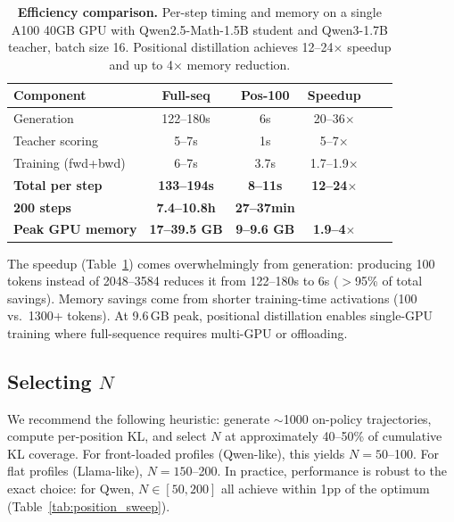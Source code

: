 \documentclass[10pt]{article}
\begin{document}
\begin{table}[t]
\centering
\caption{\textbf{Efficiency comparison.} Per-step timing and memory on a single A100 40GB GPU with Qwen2.5-Math-1.5B student and Qwen3-1.7B teacher, batch size 16. Positional distillation achieves 12--24$\times$ speedup and up to 4$\times$ memory reduction.}
\label{tab:efficiency}
\small
\begin{tabular}{@{}lccccc@{}}
\toprule
\textbf{Component} & \textbf{Full-seq} & \textbf{Pos-100} & \textbf{Speedup} \\
\midrule
Generation               & 122--180s & 6s  & 20--36$\times$ \\
Teacher scoring           & 5--7s     & 1s  & 5--7$\times$ \\
Training (fwd+bwd)       & 6--7s     & 3.7s & 1.7--1.9$\times$ \\
\midrule
\textbf{Total per step}  & \textbf{133--194s} & \textbf{8--11s} & \textbf{12--24$\times$} \\
\textbf{200 steps}       & \textbf{7.4--10.8h} & \textbf{27--37min} & \\
\textbf{Peak GPU memory} & \textbf{17--39.5 GB} & \textbf{9--9.6 GB} & \textbf{1.9--4$\times$} \\
\bottomrule
\end{tabular}
\end{table}

The speedup (Table~\ref{tab:efficiency}) comes overwhelmingly from generation: producing 100 tokens instead of 2048--3584 reduces it from 122--180s to 6s ($>$95\% of total savings). Memory savings come from shorter training-time activations (100 vs.\ 1300+ tokens). At 9.6\,GB peak, positional distillation enables single-GPU training where full-sequence requires multi-GPU or offloading.

\subsection{Selecting $N$}
\label{sec:selecting_n}

We recommend the following heuristic: generate $\sim$1000 on-policy trajectories, compute per-position KL, and select $N$ at approximately 40--50\% of cumulative KL coverage.
For front-loaded profiles (Qwen-like), this yields $N = 50$--100.
For flat profiles (Llama-like), $N = 150$--200.
In practice, performance is robust to the exact choice: for Qwen, $N \in [50, 200]$ all achieve within 1pp of the optimum (Table~\ref{tab:position_sweep}).


\end{document}
